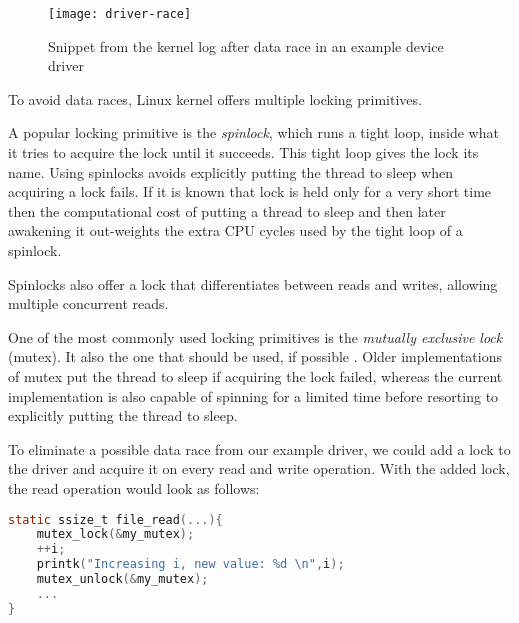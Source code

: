 \documentclass[..thesis.tex]{subfiles}
\begin{document}

\begin{figure}[H]
\centering
\texttt{[image: driver-race]}
\caption{Snippet from the kernel log after data race in an example device driver}
\label{fig:driver-race}
\end{figure}



To avoid data races, Linux kernel offers multiple locking primitives. 

A popular locking primitive is the \textit{spinlock}, which runs a tight loop, inside what it tries to acquire the lock until it succeeds. This tight loop gives the lock its name. Using spinlocks avoids explicitly putting the thread to sleep when acquiring a lock fails. If it is known that lock is held only for a very short time then the computational cost of putting a thread to sleep and then later awakening it out-weights the extra CPU cycles used by the tight loop of a spinlock.

Spinlocks also offer a lock that differentiates between reads and writes, allowing multiple concurrent reads.

One of the most commonly used locking primitives is the \textit{mutually exclusive lock} (mutex). It also the one that should be used, if possible \cite[Documentation/locking/mutex-design.txt]{torvalds_linux}. Older implementations of mutex put the thread to sleep if acquiring the lock failed, whereas the current implementation is also capable of spinning for a limited time before resorting to explicitly putting the thread to sleep.


To eliminate a possible data race from our example driver, we could add a lock to the driver and acquire it on every read and write operation. With the added lock, the read operation would look as follows:

\begin{lstlisting}[language=C,style=def]
static ssize_t file_read(...){
    mutex_lock(&my_mutex);
    ++i;
    printk("Increasing i, new value: %d \n",i);
    mutex_unlock(&my_mutex);
    ...
}
\end{lstlisting}
\end{document}
